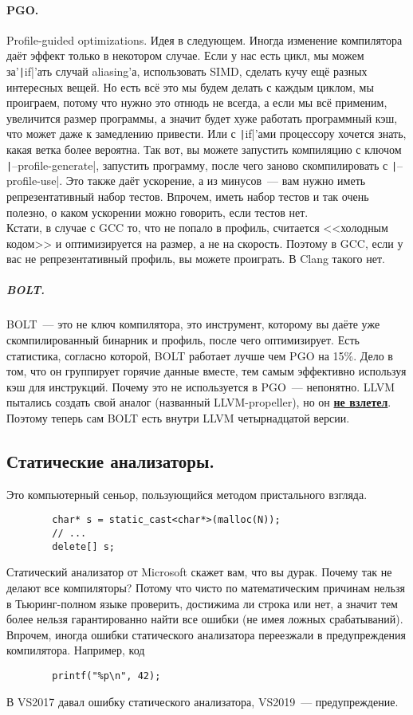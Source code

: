 \documentclass{article}
\begin{document}
    \paragraph{PGO.}
    Profile-guided optimizations. Идея в следующем. Иногда изменение компилятора даёт эффект только в некотором случае. Если у нас есть цикл, мы можем за'\texttt|if|'ать случай aliasing'а, использовать SIMD, сделать кучу ещё разных интересных вещей. Но есть всё это мы будем делать с каждым циклом, мы проиграем, потому что нужно это отнюдь не всегда, а если мы всё применим, увеличится размер программы, а значит будет хуже работать программный кэш, что может даже к замедлению привести. Или с \texttt|if|'ами процессору хочется знать, какая ветка более вероятна. Так вот, вы можете запустить компиляцию с ключом \texttt|--profile-generate|, запустить программу, после чего заново скомпилировать с \texttt|--profile-use|. Это также даёт ускорение, а из минусов~--- вам нужно иметь репрезентативный набор тестов. Впрочем, иметь набор тестов и так очень полезно, о каком ускорении можно говорить, если тестов нет.\\
    Кстати, в случае с GCC то, что не попало в профиль, считается <<холодным кодом>> и оптимизируется на размер, а не на скорость. Поэтому в GCC, если у вас не репрезентативный профиль, вы можете проиграть. В Clang такого нет.
    \subparagraph{BOLT.}
    BOLT~--- это не ключ компилятора, это инструмент, которому вы даёте уже скомпилированный бинарник и профиль, после чего оптимизирует. Есть статистика, согласно которой, BOLT работает лучше чем PGO на 15\%. Дело в том, что он группирует горячие данные вместе, тем самым эффективно используя кэш для инструкций. Почему это не используется в PGO~--- непонятно. LLVM пытались создать свой аналог (названный LLVM-propeller), но он \underline{\textbf{не взлетел}}. Поэтому теперь сам BOLT есть внутри LLVM четырнадцатой версии.
    \subsection{Статические анализаторы.}
    Это компьютерный сеньор, пользующийся методом пристального взгляда.
    \begin{verbatim}
        char* s = static_cast<char*>(malloc(N));
        // ...
        delete[] s;
    \end{verbatim}
    Статический анализатор от Microsoft скажет вам, что вы дурак. Почему так не делают все компиляторы? Потому что чисто по математическим причинам нельзя в Тьюринг-полном языке проверить, достижима ли строка или нет, а значит тем более нельзя гарантированно найти все ошибки (не имея ложных срабатываний). Впрочем, иногда ошибки статического анализатора переезжали в предупреждения компилятора. Например, код
    \begin{verbatim}
        printf("%p\n", 42);
    \end{verbatim}
    В VS2017 давал ошибку статического анализатора, VS2019~--- предупреждение.
\end{document}
